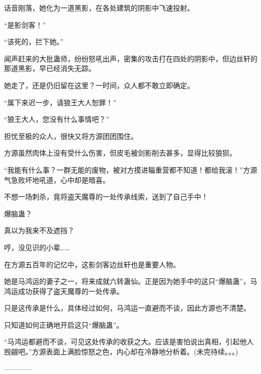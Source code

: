 \begin{this_body}
话音刚落，她化为一道黑影，在各处建筑的阴影中飞速投射。

“是影剑客！”

“该死的，拦下她。”

闻声赶来的大批蛊师，纷纷怒吼出声，密集的攻击打在四处的阴影中，但边丝轩的那道黑影，早已经消失无踪。

她走了，还是仍旧留在这里？一时间，众人都不敢立即确定。

“属下来迟一步，请狼王大人恕罪！”

“狼王大人，您没有什么事情吧？”

担忧至极的众人，很快又将方源团团围住。

方源虽然肉体上没有受什么伤害，但皮毛被剑影削去甚多，显得比较狼狈。

“我能有什么事？一群无能的废物，被对方摸进辎重营都不知道！都给我滚！”方源气急败坏地吼道，心中却是暗喜。

不想一场刺杀，竟将盗天魔尊的一处传承线索，送到了自己手中！

爆脑蛊？

真以为我来不及遮挡？

哼，没见识的小辈……

在方源五百年的记忆中，这影剑客边丝轩也是重要人物。

她是马鸿运的妻子之一，将来成就六转蛊仙。正是因为她手中的这只“爆脑蛊”，马鸿运成功获得了盗天魔尊的一处传承。

只是这传承是什么，具体经过如何，马鸿运一直避而不谈，因此方源也不清楚。

只知道如何正确地开启这只“爆脑蛊”。

“马鸿运都避而不谈，可见这处传承的收获之大。应该是害怕说出真相，引起他人觊觎吧。”方源表面上满脸惊怒之色，内心却在冷静地分析着。(未完待续。。。)

------------

\end{this_body}

